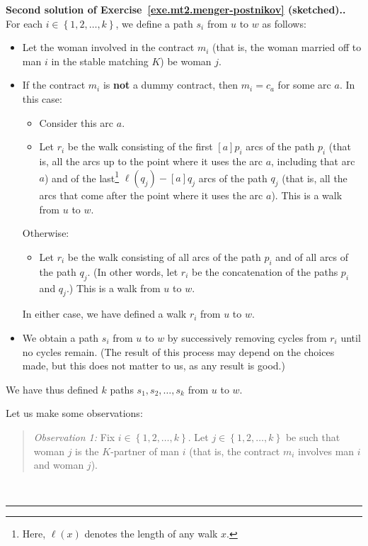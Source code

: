\documentclass[numbers=enddot,12pt,final,onecolumn,notitlepage]{scrartcl}%
\theoremstyle{definition}
\newenvironment{statement}{\begin{quote}}{\end{quote}}
\newenvironment{proof}[1][Proof]{\noindent\textbf{#1.} }{\ \rule{0.5em}{0.5em}}
\newcommand{\set}[1]{\left\{ #1 \right\}}
\newcommand{\tup}[1]{\left( #1 \right)}
\newcommand{\ive}[1]{\left[ #1 \right]}
\begin{document}
\begin{proof}[Second solution of
Exercise~\ref{exe.mt2.menger-postnikov} (sketched).]
For each $i \in \set{1, 2, \ldots, k}$, we define a path $s_i$
from $u$ to $w$ as follows:
\begin{itemize}
\item Let the woman involved in the contract $m_i$ (that is, the
      woman married off to man $i$ in the stable matching $K$) be
      woman $j$.
\item If the contract $m_i$ is \textbf{not} a dummy contract,
      then $m_i = c_a$ for some arc $a$.
      In this case:
      \begin{itemize}
      \item Consider this arc $a$.
      \item Let $r_i$ be the walk consisting of the first
            $\ive{a} p_i$ arcs of the path $p_i$
            (that is, all the arcs up to the point where it uses
            the arc $a$, including that arc $a$) and of the
            last\footnote{Here, $\ell\tup{x}$ denotes the length
            of any walk $x$.}
            $\ell\tup{q_j} - \ive{a} q_j$ arcs of the path
            $q_j$ (that is, all the arcs that come after the point
            where it uses the arc $a$).
            This is a walk from $u$ to $w$.
      \end{itemize}
      Otherwise:
      \begin{itemize}
      \item Let $r_i$ be the walk consisting of all
            arcs of the path $p_i$
            and of all arcs of the path $q_j$.
            (In other words, let $r_i$ be the concatenation of
            the paths $p_i$ and $q_j$.)
            This is a walk from $u$ to $w$.
      \end{itemize}
      In either case, we have defined a walk $r_i$ from $u$ to $w$.
\item We obtain a path $s_i$ from $u$ to $w$ by successively
      removing cycles from $r_i$ until no cycles remain.
      (The result of this process may depend on the choices made,
      but this does not matter to us, as any result is good.)
\end{itemize}

We have thus defined $k$ paths $s_1, s_2, \ldots, s_k$ from
$u$ to $w$.

Let us make some observations:

\begin{statement}
\textit{Observation 1:}
Fix $i \in \set{1, 2, \ldots, k}$.
Let $j \in \set{1, 2, \ldots, k}$ be such that woman $j$ is
the $K$-partner of man $i$
(that is, the contract $m_i$ involves man $i$ and woman $j$).


\end{statement}
\end{proof}
\end{document}
